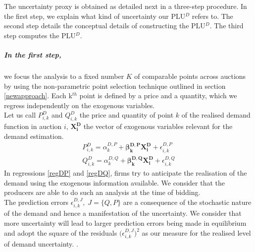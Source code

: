 The uncertainty proxy
is obtained as detailed next in a three-step procedure. In the first step, we explain what kind of uncertainty our PLU$^D$ refers to. The second step details the conceptual details of constructing the PLU$^D$. The third step computes the PLU$^D$. %


\subparagraph{In the first step,} 
\label{firststepresiduals}
we focus the analysis to a fixed number $K$ of comparable points across auctions by using the non-parametric point selection technique outlined in section \ref{newapproach}. 
Each k$^{th}$ point is defined by a price and a quantity, which we regress independently on the exogenous variables. \\%

Let us call $P_{i,k}^D$ and $Q_{i,k}^D$ the price and quantity of point $k$ of the realised demand function in auction $i$, $\boldsymbol{X^D_i}$ the vector of exogenous variables relevant for the demand estimation.
\begin{eqnarray}
P_{i,k}^D=\alpha_{k}^{D,P}+{\boldsymbol{\beta_{k}^{D,P}}} \boldsymbol{X^D_i}+\epsilon_{i,k}^{D,P} \label{regDP}\\
Q_{i,k}^D=\alpha_{k}^{D,Q}+{\boldsymbol{\beta_{k}^{D,Q}}} \boldsymbol{X^D_i}+\epsilon_{i,k}^{D,Q} \label{regDQ}
\end{eqnarray}
In regressions \ref{regDP} and \ref{regDQ}, firms try to anticipate the realisation of the demand using the exogenous information available. We consider that the producers are able to do such an analysis at the time of bidding. \\%

The prediction errors  $\epsilon_{i,k}^{D,J}, \; J=\{Q, P\}$ are a consequence of the stochastic nature of the demand and hence a manifestation of the uncertainty. We consider that more uncertainty will lead to larger prediction errors being made in equilibrium and adopt the 
square
of the residuals $ \bigl( \epsilon_{i,k}^{D,J} \bigr)^2$ as our measure for the realised level of demand uncertainty.%
.

